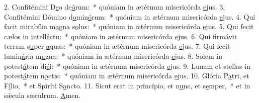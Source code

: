 2. Confitémini D\uline{e}o de\uline{ó}rum:~* quóniam in ætérnum misericórda \uline{e}jus.
3. Confitémini Dómino d\uline{o}min\uline{ó}rum:~* quóniam in ætérnum misericórda \uline{e}jus.
4. Qui facit mirabília m\uline{a}gna s\uline{o}lus:~* quóniam in ætérnum misericórda \uline{e}jus.
5. Qui fecit cælos in \uline{i}ntell\uline{é}ctu:~* quóniam in ætérnum misericórda \uline{e}jus.
6. Qui firmávit terram s\uline{u}per \uline{a}quas:~* quóniam in ætérnum misericórda \uline{e}jus.
7. Qui fecit lumin\uline{á}ria m\uline{a}gna:~* quóniam in ætérnum misericórda \uline{e}jus.
8. Solem in potest\uline{á}tem di\uline{é}i:~* quóniam in ætérnum misericórda \uline{e}jus.
9. Lunam et stellas in potest\uline{á}tem n\uline{o}ctis:~* quóniam in ætérnum misericórda \uline{e}jus.
10. Glória P\uline{a}tri, et F\uline{í}lio,~* et Spiríti S\uline{a}ncto.
11. Sicut erat in princípio, et n\uline{u}nc, et s\uline{e}mper,~* et in sǽcula sæculrum. \uline{A}men.
